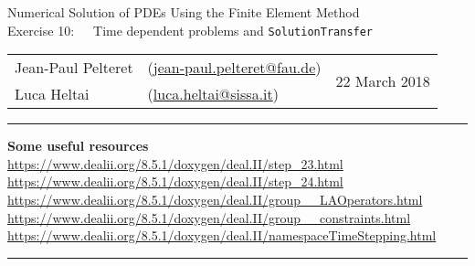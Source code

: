 \documentclass[11pt,answers]{exam}
\makeatletter
\newcommand{\makeheader}[3]{%
\setcounter{question}{0}
\begin{center}
{\sc Numerical Solution of PDEs Using the Finite Element Method}\vspace{2ex}\\
{\sc Exercise #1:\ \ \ #2}\vspace{2ex}\\
\begin{tabular*}{\textwidth}{ll @{\extracolsep{\fill}}r}
Jean-Paul Pelteret & (\url{jean-paul.pelteret@fau.de}) & \multirow{2}{*}{#3} \\
Luca Heltai & (\url{luca.heltai@sissa.it}) & \\
\end{tabular*}
\end{center}
}
\newcommand{\makeresources}[1]{%
\rule{\textwidth}{0.6mm}
\textbf{Some useful resources}\\[1.5ex]
#1 \par
\rule{\textwidth}{0.6mm}
}
\makeatother
\begin{document}
\clearpage
\makeheader{10}{Time dependent problems and \texttt{SolutionTransfer}}{22 March 2018}
\makeresources{%
\url{https://www.dealii.org/8.5.1/doxygen/deal.II/step_23.html} \\
\url{https://www.dealii.org/8.5.1/doxygen/deal.II/step_24.html} \\
\url{https://www.dealii.org/8.5.1/doxygen/deal.II/group__LAOperators.html} \\
\url{https://www.dealii.org/8.5.1/doxygen/deal.II/group__constraints.html} \\
\url{https://www.dealii.org/8.5.1/doxygen/deal.II/namespaceTimeStepping.html}
}
\end{document}
